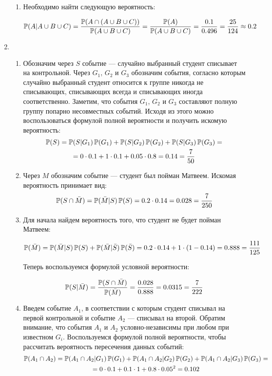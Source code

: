 \begin{enumerate}
\begin{enumerate}
	\item Необходимо найти следующую вероятность:
	
	\[
	\P(A|A\cup B\cup C)=\frac{\P(A \cap (A \cup B \cup C))}{\P(A \cup B \cup C)}=\frac{\P(A)}{\P(A \cup B \cup C)}=\frac{0.1}{0.496}=\frac{25}{124}\approx0.2
	\]
	\end{enumerate}
	
	\item
	\begin{enumerate}
		\item Обозначим через $S$ событие — случайно выбранный студент списывает на контрольной. Через $G_{1}$, $G_{2}$ и $G_{3}$ обозначим события, согласно которым случайно выбранный студент относится к группе никогда не списывающих, списывающих всегда и  списывающих иногда соответственно.
		Заметим, что события $G_{1}$, $G_{2}$ и $G_{3}$ составляют полную группу попарно несовместных событий. Исходя из этого можно воспользоваться формулой полной вероятности и получить искомую вероятность:
		\begin{multline*}
		\P(S)=\P(S|G_{1})\P(G_{1})+\P(S|G_{2})\P(G_{2})+\P(S|G_{3})\P(G_{3})=\\
		=0\cdot 0.1+1\cdot 0.1+0.05\cdot 0.8=0.14=\frac{7}{50}
		\end{multline*}
		\item Через $M$ обозначим событие — студент был пойман Матвеем. Искомая вероятность принимает вид:
		\[
		\P(S\cap\bar{M})=\P(\bar{M}|S)\P(S)=0.2\cdot 0.14=0.028=\frac{7}{250}
		\]
		
		\item
		Для начала найдем вероятность того, что студент не будет пойман Матвеем:
		
		\[
		\P(\bar{M})=\P(\bar{M}|S)\P(S)+\P(\bar{M}|\bar{S})\P(\bar{S})=0.2\cdot 0.14+1\cdot (1-0.14)=0.888=\frac{111}{125}
		\]
		
		Теперь воспользуемся формулой условной вероятности:
		
		\[
		\P(S|\bar{M})=\frac{\P(S\cap \bar{M})}{\P(\bar{M})}=\frac{0.028}{0.888}=0.0315=\frac{7}{222}
		\]
		
		\item Введем событие $A_{1}$, в соответствии с которым студент списывал на первой контрольной и событие $A_{2}$ — списывал на второй. Обратим внимание, что события $A_{1}$ и $A_{2}$ условно-независимы при любом при известном $G_i$. Воспользуемся формулой полной вероятности, чтобы рассчитать вероятность пересечения данных событий:
		\begin{multline*}
		\P(A_{1}\cap A_{2})=\P(A_{1}\cap A_{2}|G_{1})\P(G_{1})+\P(A_{1}\cap A_{2}|G_{2})\P(G_{2})+\P(A_{1}\cap A_{2}|G_{3})\P(G_{3})=\\
		= 0\cdot 0.1+0.1\cdot 1+0.8\cdot 0.05^2=0.102
		\end{multline*}
	\end{enumerate}
	

\end{enumerate}
